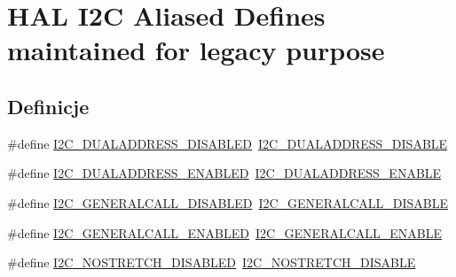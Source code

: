 \hypertarget{group___h_a_l___i2_c___aliased___defines}{}\section{H\+AL I2C Aliased Defines maintained for legacy purpose}
\label{group___h_a_l___i2_c___aliased___defines}
\subsection*{Definicje}
\begin{DoxyCompactItemize}
\item 
\#define \hyperlink{group___h_a_l___i2_c___aliased___defines_ga8772cb68ed61ea9b785c37548c557274}{I2\+C\+\_\+\+D\+U\+A\+L\+A\+D\+D\+R\+E\+S\+S\+\_\+\+D\+I\+S\+A\+B\+L\+ED}~\hyperlink{group___i2_c__dual__addressing__mode_gacb8f4a1fd543e5ef2c9e7711fc9b5a67}{I2\+C\+\_\+\+D\+U\+A\+L\+A\+D\+D\+R\+E\+S\+S\+\_\+\+D\+I\+S\+A\+B\+LE}
\item 
\#define \hyperlink{group___h_a_l___i2_c___aliased___defines_gab979000904ec1437b5741a6a24a9ac2e}{I2\+C\+\_\+\+D\+U\+A\+L\+A\+D\+D\+R\+E\+S\+S\+\_\+\+E\+N\+A\+B\+L\+ED}~\hyperlink{group___i2_c__dual__addressing__mode_gae33ff5305d9f38d857cff1774f481fab}{I2\+C\+\_\+\+D\+U\+A\+L\+A\+D\+D\+R\+E\+S\+S\+\_\+\+E\+N\+A\+B\+LE}
\item 
\#define \hyperlink{group___h_a_l___i2_c___aliased___defines_ga374e4771b33ac81e1f5602ab17224574}{I2\+C\+\_\+\+G\+E\+N\+E\+R\+A\+L\+C\+A\+L\+L\+\_\+\+D\+I\+S\+A\+B\+L\+ED}~\hyperlink{group___i2_c__general__call__addressing__mode_ga14918ea7d2b23cd67c66b49ebbf5c0a8}{I2\+C\+\_\+\+G\+E\+N\+E\+R\+A\+L\+C\+A\+L\+L\+\_\+\+D\+I\+S\+A\+B\+LE}
\item 
\#define \hyperlink{group___h_a_l___i2_c___aliased___defines_ga265e4666cb791e1f7ea601eccd6235b6}{I2\+C\+\_\+\+G\+E\+N\+E\+R\+A\+L\+C\+A\+L\+L\+\_\+\+E\+N\+A\+B\+L\+ED}~\hyperlink{group___i2_c__general__call__addressing__mode_ga5ec9ec869e4c78a597c5007c245c01a0}{I2\+C\+\_\+\+G\+E\+N\+E\+R\+A\+L\+C\+A\+L\+L\+\_\+\+E\+N\+A\+B\+LE}
\item 
\#define \hyperlink{group___h_a_l___i2_c___aliased___defines_ga2846329c0a2ba65a8f0cf0df3189e68f}{I2\+C\+\_\+\+N\+O\+S\+T\+R\+E\+T\+C\+H\+\_\+\+D\+I\+S\+A\+B\+L\+ED}~\hyperlink{group___i2_c__nostretch__mode_ga611deefe89e56fa65f853e6796f2cf66}{I2\+C\+\_\+\+N\+O\+S\+T\+R\+E\+T\+C\+H\+\_\+\+D\+I\+S\+A\+B\+LE}
\item 

\end{DoxyCompactItemize}
